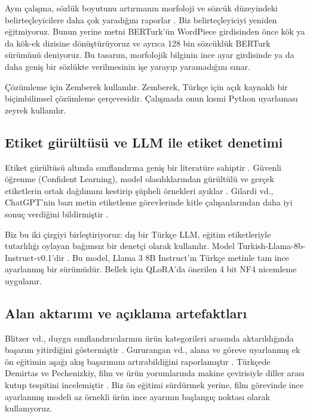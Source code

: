 \documentclass[11pt]{article}
\begin{document}
Aynı çalışma, sözlük boyutunu artırmanın morfoloji ve sözcük düzeyindeki belirteçleyicilere daha çok yaradığını raporlar \citep{toraman2023}. Biz belirteçleyiciyi yeniden eğitmiyoruz. Bunun yerine metni BERTurk'ün WordPiece girdisinden önce kök ya da kök-ek dizisine dönüştürüyoruz ve ayrıca 128 bin sözcüklük BERTurk sürümünü deniyoruz. Bu tasarım, morfolojik bilginin ince ayar girdisinde ya da daha geniş bir sözlükte verilmesinin işe yarayıp yaramadığını sınar.

Çözümleme için Zemberek \citep{akin2007} kullanılır. Zemberek, Türkçe için açık kaynaklı bir biçimbilimsel çözümleme çerçevesidir. Çalışmada onun kısmi Python uyarlaması zeyrek \citep{zeyrek} kullanılır.

\subsection{Etiket gürültüsü ve LLM ile etiket denetimi}

Etiket gürültüsü altında sınıflandırma geniş bir literatüre sahiptir \citep{frenay2014}. Güvenli öğrenme (Confident Learning), model olasılıklarından gürültülü ve gerçek etiketlerin ortak dağılımını kestirip şüpheli örnekleri ayıklar \citep{northcutt2021}. Gilardi vd., ChatGPT'nin bazı metin etiketleme görevlerinde kitle çalışanlarından daha iyi sonuç verdiğini bildirmiştir \citep{gilardi2023}.

Biz bu iki çizgiyi birleştiriyoruz: dış bir Türkçe LLM, eğitim etiketleriyle tutarlılığı oylayan bağımsız bir denetçi olarak kullanılır. Model Turkish-Llama-8b-Instruct-v0.1'dir \citep{kesgin2024}. Bu model, Llama 3 8B Instruct'ın \citep{grattafiori2024} Türkçe metinle tam ince ayarlanmış bir sürümüdür. Bellek için QLoRA'da önerilen 4 bit NF4 nicemleme \citep{dettmers2023} uygulanır.

\subsection{Alan aktarımı ve açıklama artefaktları}

Blitzer vd., duygu sınıflandırıcılarının ürün kategorileri arasında aktarıldığında başarım yitirdiğini göstermiştir \citep{blitzer2007}. Gururangan vd., alana ve göreve uyarlanmış ek ön eğitimin aşağı akış başarımını artırabildiğini raporlamıştır \citep{gururangan2020}. Türkçede Demirtas ve Pechenizkiy, film ve ürün yorumlarında makine çevirisiyle diller arası kutup tespitini incelemiştir \citep{demirtas2013}. Biz ön eğitimi sürdürmek yerine, film görevinde ince ayarlanmış modeli az örnekli ürün ince ayarının başlangıç noktası olarak kullanıyoruz.
\end{document}
